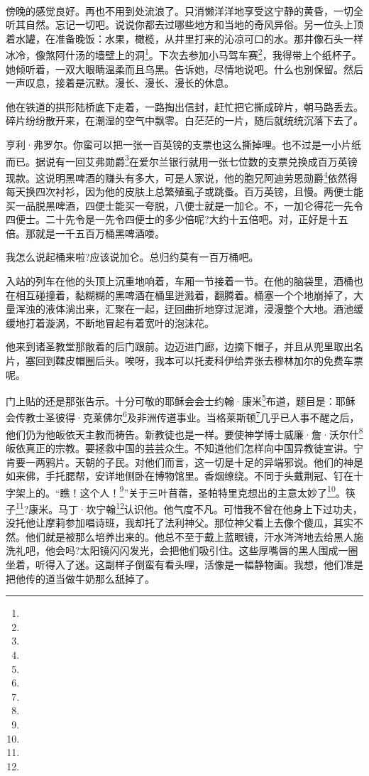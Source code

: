 \par  
\par 傍晚的感觉良好。再也不用到处流浪了。只消懒洋洋地享受这宁静的黄昏，一切全听其自然。忘记一切吧。说说你都去过哪些地方和当地的奇风异俗。另一位头上顶着水罐，在准备晚饭：水果，橄榄，从井里打来的沁凉可口的水。那井像石头一样冰冷，像煞阿什汤的墙壁上的洞\footnote{}。下次去参加小马驾车赛\footnote{}，我得带上个纸杯子。她倾听着，一双大眼睛温柔而且乌黑。告诉她，尽情地说吧。什么也别保留。然后一声叹息，接着是沉默。漫长、漫长、漫长的休息。
\par 他在铁道的拱形陆桥底下走着，一路掏出信封，赶忙把它撕成碎片，朝马路丢去。碎片纷纷散开来，在潮湿的空气中飘零。白茫茫的一片，随后就统统沉落下去了。
\par 亨利·弗罗尔。你蛮可以把一张一百英镑的支票也这么撕掉哩。也不过是一小片纸而已。据说有一回艾弗勋爵\footnote{}在爱尔兰银行就用一张七位数的支票兑换成百万英镑现款。这说明黑啤酒的赚头有多大，可是人家说，他的胞兄阿迪劳恩勋爵\footnote{}依然得每天换四次衬衫，因为他的皮肤上总繁殖虱子或跳蚤。百万英镑，且慢。两便士能买一品脱黑啤酒，四便士能买一夸脱，八便士就是一加仑。不，一加仑得花一先令四便士。二十先令是一先令四便士的多少倍呢?大约十五倍吧。对，正好是十五倍。那就是一千五百万桶黑啤酒喽。
\par 我怎么说起桶来啦?应该说加仑。总归约莫有一百万桶吧。
\par 入站的列车在他的头顶上沉重地响着，车厢一节接着一节。在他的脑袋里，酒桶也在相互碰撞着，黏糊糊的黑啤酒在桶里迸溅着，翻腾着。桶塞一个个地崩掉了，大量浑浊的液体淌出来，汇聚在一起，迂回曲折地穿过泥滩，浸漫整个大地。酒池缓缓地打着漩涡，不断地冒起有着宽叶的泡沫花。
\par 他来到诸圣教堂那敞着的后门跟前。边迈进门廊，边摘下帽子，并且从兜里取出名片，塞回到鞣皮帽圈后头。唉呀，我本可以托麦科伊给弄张去穆林加尔的免费车票呢。
\par 门上贴的还是那张告示。十分可敬的耶稣会会士约翰·康米\footnote{}布道，题目是：耶稣会传教士圣彼得·克莱佛尔\footnote{}及非洲传道事业。当格莱斯顿\footnote{}几乎已人事不醒之后，他们仍为他皈依天主教而祷告。新教徒也是一样。要使神学博士威廉·詹·沃尔什\footnote{}皈依真正的宗教。要拯救中国的芸芸众生。不知道他们怎样向中国异教徒宣讲。宁肯要一两鸦片。天朝的子民。对他们而言，这一切是十足的异端邪说。他们的神是如来佛，手托腮帮，安详地侧卧在博物馆里。香烟缭绕。不同于头戴荆冠、钉在十字架上的。“瞧！这个人！\footnote{}”关于三叶苜蓿，圣帕特里克想出的主意太妙了\footnote{}。筷子\footnote{}?康米。马丁·坎宁翰\footnote{}认识他。他气度不凡。可惜我不曾在他身上下过功夫，没托他让摩莉参加唱诗班，我却托了法利神父。那位神父看上去像个傻瓜，其实不然。他们就是被那么培养出来的。他总不至于戴上蓝眼镜，汗水涔涔地去给黑人施洗礼吧，他会吗?太阳镜闪闪发光，会把他们吸引住。这些厚嘴唇的黑人围成一圈坐着，听得入了迷。这副样子倒蛮有看头哩，活像是一幅静物画。我想，他们准是把他传的道当做牛奶那么舐掉了。
